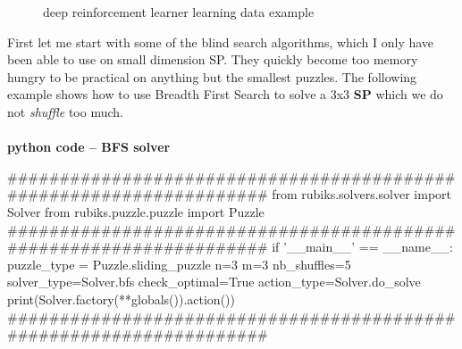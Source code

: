 \begin{figure}[H]
  \noindent
  \caption[Examples]{deep reinforcement learner learning data example}
  \label{fig:exampledeepreinforcementlearnerlearning}
\end{figure}




First let me start with some of the blind search algorithms, which I only have been able to use on small dimension SP. They quickly become too memory hungry to be practical on anything but the smallest puzzles.
\label{BFSSS}
The following example shows how to use Breadth First Search to solve a 3x3 \textbf{SP} which we do not \textit{shuffle} too much.

\afblue
\paragraph{}{\textbf{python code -- \textbf{BFS} solver}}
\begin{python}
####################################################################
from rubiks.solvers.solver import Solver
from rubiks.puzzle.puzzle import Puzzle
####################################################################
if '__main__' == __name__:
    puzzle_type = Puzzle.sliding_puzzle
    n=3
    m=3
    nb_shuffles=5
    solver_type=Solver.bfs
    check_optimal=True
    action_type=Solver.do_solve
    print(Solver.factory(**globals()).action())
####################################################################
\end{python}
\black

